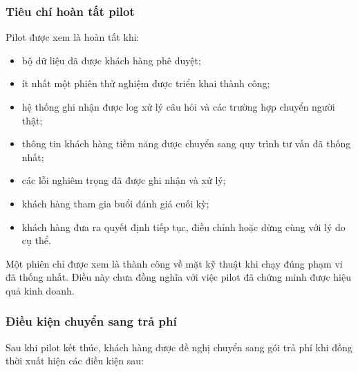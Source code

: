 \subsubsection{Tiêu chí hoàn tất pilot}

Pilot được xem là hoàn tất khi:

\begin{itemize}
    \item bộ dữ liệu đã được khách hàng phê duyệt;
    \item ít nhất một phiên thử nghiệm được triển khai thành công;
    \item hệ thống ghi nhận được log xử lý câu hỏi và các trường hợp chuyển người thật;
    \item thông tin khách hàng tiềm năng được chuyển sang quy trình tư vấn đã thống nhất;
    \item các lỗi nghiêm trọng đã được ghi nhận và xử lý;
    \item khách hàng tham gia buổi đánh giá cuối kỳ;
    \item khách hàng đưa ra quyết định tiếp tục, điều chỉnh hoặc dừng cùng với lý do cụ thể.
\end{itemize}

Một phiên chỉ được xem là thành công về mặt kỹ thuật khi chạy đúng phạm vi đã thống nhất. Điều này chưa đồng nghĩa với việc pilot đã chứng minh được hiệu quả kinh doanh.

\subsubsection{Điều kiện chuyển sang trả phí}

Sau khi pilot kết thúc, khách hàng được đề nghị chuyển sang gói trả phí khi đồng thời xuất hiện các điều kiện sau:

